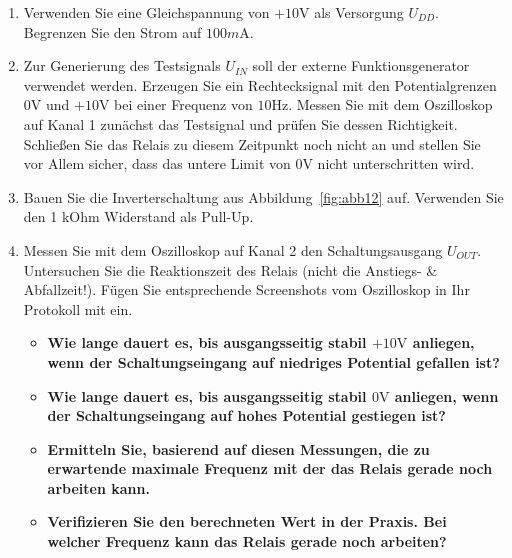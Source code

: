 \documentclass[10pt]{scrreprt}
\begin{document}
    \begin{enumerate}
        \item Verwenden Sie eine Gleichspannung von $+10\si{\volt}$ als Versorgung $U_{DD}$.
            Begrenzen Sie den Strom auf $100\si{m\ampere}$.
        \item Zur Generierung des Testsignals $U_{IN}$ soll der externe Funktionsgenerator verwendet
            werden. Erzeugen Sie ein Rechtecksignal mit den Potentialgrenzen $0\si{\volt}$ und $+10\si{\volt}$
            bei einer Frequenz von $10\si{\hertz}$. Messen Sie mit dem Oszilloskop auf Kanal 1 zunächst
            das Testsignal und prüfen Sie dessen Richtigkeit. Schließen Sie das Relais zu diesem
            Zeitpunkt noch nicht an und stellen Sie vor Allem sicher, dass das untere Limit von
            $0\si{\volt}$ nicht unterschritten wird.
        \item Bauen Sie die Inverterschaltung aus Abbildung~\ref{fig:abb12} auf. Verwenden Sie den 1 kOhm
            Widerstand als Pull-Up.
        \item Messen Sie mit dem Oszilloskop auf Kanal 2 den Schaltungsausgang $U_{OUT}$.
            Untersuchen Sie die Reaktionszeit des Relais (nicht die Anstiegs- \& Abfallzeit!). Fügen
            Sie entsprechende Screenshots vom Oszilloskop in Ihr Protokoll mit ein.
            \begin{itemize}
                \item \textbf{
                        Wie lange dauert es, bis ausgangsseitig stabil $+10\si{\volt}$ anliegen, wenn
                        der Schaltungseingang auf niedriges Potential gefallen ist?
                    }
                \item \textbf{
                        Wie lange dauert es, bis ausgangsseitig stabil $0\si{\volt}$ anliegen, wenn
                        der Schaltungseingang auf hohes Potential gestiegen ist?
                    }
                \item \textbf{
                        Ermitteln Sie, basierend auf diesen Messungen, die zu erwartende
                        maximale Frequenz mit der das Relais gerade noch arbeiten kann.
                    }
                \item \textbf{
                        Verifizieren Sie den berechneten Wert in der Praxis. Bei welcher
                        Frequenz kann das Relais gerade noch arbeiten?
                    }
            \end{itemize}
    \end{enumerate}
\end{document}
